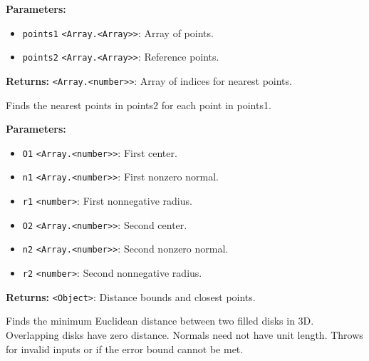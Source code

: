\documentclass[12pt,a4paper]{article}
\begin{document}
\vspace{5mm}
\noindent {}


\noindent \textbf{Parameters:}
\begin{itemize}
  \item \texttt{points1} \texttt{<Array.<Array>>}: Array of points.
  \item \texttt{points2} \texttt{<Array.<Array>>}: Reference points.
\end{itemize}

\noindent \textbf{Returns:} \texttt{<Array.<number>>}: Array of indices for nearest points.

\noindent Finds the nearest points in points2 for each point in points1.

\vspace{5mm}
\noindent {}


\noindent \textbf{Parameters:}
\begin{itemize}
  \item \texttt{O1} \texttt{<Array.<number>>}: First center.
  \item \texttt{n1} \texttt{<Array.<number>>}: First nonzero normal.
  \item \texttt{r1} \texttt{<number>}: First nonnegative radius.
  \item \texttt{O2} \texttt{<Array.<number>>}: Second center.
  \item \texttt{n2} \texttt{<Array.<number>>}: Second nonzero normal.
  \item \texttt{r2} \texttt{<number>}: Second nonnegative radius.
\end{itemize}

\noindent \textbf{Returns:} \texttt{<Object>}: Distance bounds and closest points.

\noindent Finds the minimum Euclidean distance between two filled disks in 3D.
Overlapping disks have zero distance. Normals need not have unit length.
Throws for invalid inputs or if the error bound cannot be met.

\vspace{5mm}
\noindent {}
\end{document}
